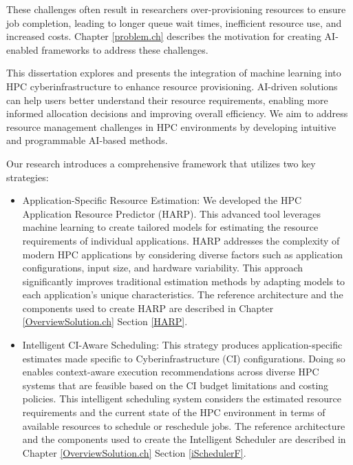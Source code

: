 These challenges often result in researchers over-provisioning resources to ensure job completion, leading to longer queue wait times, inefficient resource use, and increased costs. Chapter \ref{problem.ch} describes the motivation for creating AI-enabled frameworks to address these challenges. 

This dissertation explores and presents the integration of machine learning into HPC cyberinfrastructure to enhance resource provisioning. AI-driven solutions can help users better understand their resource requirements, enabling more informed allocation decisions and improving overall efficiency. We aim to address resource management challenges in HPC environments by developing intuitive and programmable AI-based methods.


Our research introduces a comprehensive framework that utilizes two key strategies:
\begin{itemize}
    \item Application-Specific Resource Estimation: We developed the HPC Application Resource Predictor (HARP). This advanced tool leverages machine learning to create tailored models for estimating the resource requirements of individual applications. HARP addresses the complexity of modern HPC applications by considering diverse factors such as application configurations, input size, and hardware variability. This approach significantly improves traditional estimation methods by adapting models to each application's unique characteristics. The reference architecture and the components used to create HARP are described in Chapter \ref{OverviewSolution.ch} Section \ref{HARP}.
    \item Intelligent CI-Aware Scheduling: This strategy produces application-specific estimates made specific to  Cyberinfrastructure (CI) configurations. Doing so enables context-aware execution recommendations across diverse HPC systems that are feasible based on the CI budget limitations and costing policies. This intelligent scheduling system considers the estimated resource requirements and the current state of the HPC environment in terms of available resources to schedule or reschedule jobs. The reference architecture and the components used to create the Intelligent Scheduler are described in Chapter \ref{OverviewSolution.ch} Section \ref{iSchedulerF}.
\end{itemize}
    

